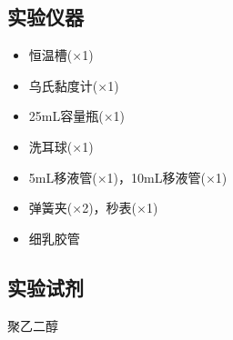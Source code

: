 \documentclass[12pt,hyperref,a4paper,UTF8]{ctexart}
\begin{document}
\subsection{实验仪器}
\begin{itemize}
    \item 恒温槽($\times$1)
    \item 乌氏黏度计($\times$1)
    \item 25mL容量瓶($\times$1)
    \item 洗耳球($\times$1)
    \item 5mL移液管($\times$1)，10mL移液管($\times$1)
    \item 弹簧夹($\times$2)，秒表($\times$1)
    \item 细乳胶管
\end{itemize}

\subsection{实验试剂}
聚乙二醇
\end{document}
